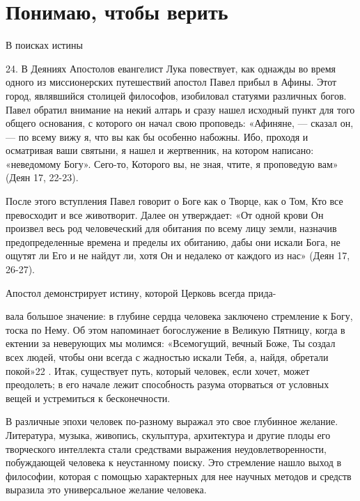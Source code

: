 \documentclass[a5paper,10pt]{article}
\begin{document}
\section{Понимаю, чтобы верить}

В поисках истины

24. В Деяниях Апостолов евангелист Лука повествует, как однажды во время одного
из миссионерских путешествий апостол Павел прибыл в Афины. Этот город,
являвшийся столицей философов, изобиловал статуями различных богов. Павел
обратил внимание на некий алтарь и сразу нашел исходный пункт для того общего
основания, с которого он начал свою проповедь: «Афиняне, — сказал он, — по
всему вижу я, что вы как бы особенно набожны. Ибо, проходя и осматривая ваши
святыни, я нашел и жертвенник, на котором написано: «неведомому Богу». Сего-то,
Которого вы, не зная, чтите, я проповедую вам» (Деян 17, 22-23).

После этого вступления Павел говорит о Боге как о Творце, как о Том, Кто все
превосходит и все животворит. Далее он утверждает: «От одной крови Он произвел
весь род человеческий для обитания по всему лицу земли, назначив
предопределенные времена и пределы их обитанию, дабы они искали Бога, не ощутят
ли Его и не найдут ли, хотя Он и недалеко от каждого из нас» (Деян 17, 26-27).

Апостол демонстрирует истину, которой Церковь всегда прида-

вала большое значение: в глубине сердца человека заключено стремление к Богу,
тоска по Нему. Об этом напоминает богослужение в Великую Пятницу, когда в
ектении за неверующих мы молимся: «Всемогущий, вечный Боже, Ты создал всех
людей, чтобы они всегда с жадностью искали Тебя, а, найдя, обретали покой»22 .
Итак, существует путь, который человек, если хочет, может преодолеть; в его
начале лежит способность разума оторваться от условных вещей и устремиться к
бесконечности.

В различные эпохи человек по-разному выражал это свое глубинное желание.
Литература, музыка, живопись, скульптура, архитектура и другие плоды его
творческого интеллекта стали средствами выражения неудовлетворенности,
побуждающей человека к неустанному поиску. Это стремление нашло выход в
философии, которая с помощью характерных для нее научных методов и средств
выразила это универсальное желание человека.
\end{document}
